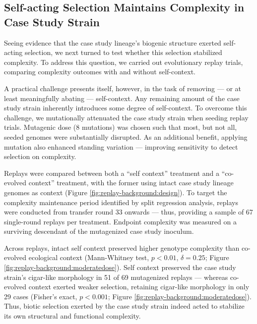 \subsection{Self-acting Selection Maintains Complexity in Case Study Strain}
\label{sec:self-acting-selection-maintains-complexity-in-case-study-strain}



Seeing evidence that the case study lineage's biogenic structure exerted self-acting selection, we next turned to test whether this selection stabilized complexity.
To address this question, we carried out evolutionary replay trials, comparing complexity outcomes with and without self-context.

A practical challenge presents itself, however, in the task of removing --- or at least meaningfully abating --- self-context.
Any remaining amount of the case study strain inherently introduces some degree of self-context.
To overcome this challenge, we mutationally attenuated the case study strain when seeding replay trials.
Mutagenic dose (8 mutations) was chosen such that most, but not all, seeded genomes were substantially disrupted.
As an additional benefit, applying mutation also enhanced standing variation --- improving sensitivity to detect selection on complexity.

Replays were compared between both a ``self context'' treatment and a ``co-evolved context'' treatment, with the former using intact case study lineage genomes as context (Figure \ref{fig:replay-background:design}).
To target the complexity maintenance period identified by split regression analysis, replays were conducted from transfer round 33 onwards --- thus, providing a sample of 67 single-round replays per treatment.
Endpoint complexity was measured on a surviving descendant of the mutagenized case study inoculum.

Across replays, intact self context preserved higher genotype complexity than co-evolved ecological context
(Mann-Whitney test, $p < 0.01$, $\delta = 0.25$; Figure \ref{fig:replay-background:moderatedose}).
Self context preserved the case study strain's cigar-like morphology in 51 of 69 mutagenized replays --- whereas co-evolved context exerted weaker selection, retaining cigar-like morphology in only 29 cases (Fisher's exact, $p < 0.001$; Figure \ref{fig:replay-background:moderatedose}).
Thus, biotic selection exerted by the case study strain indeed acted to stabilize its own structural and functional complexity.


